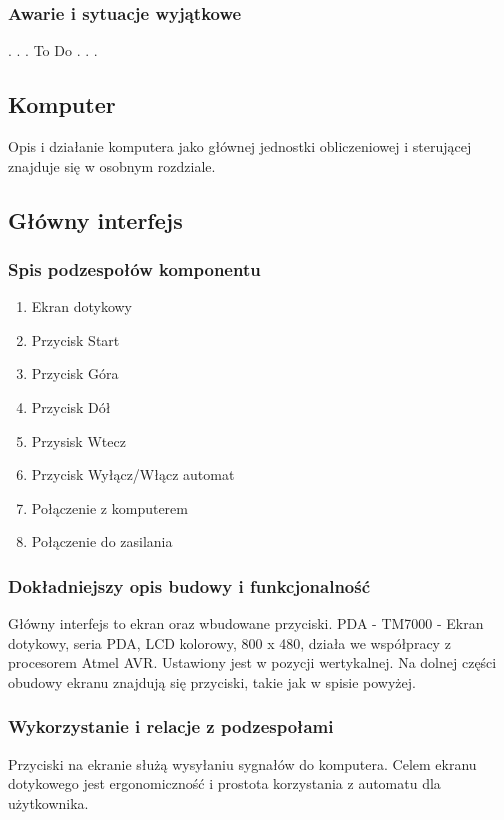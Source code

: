 \documentclass[12pt,a4paper,notitlepage]{report}
\begin{document}
\subsubsection{Awarie i sytuacje wyjątkowe}
. . . To Do . . .



\subsection{Komputer}
Opis i działanie komputera jako głównej jednostki obliczeniowej i sterującej znajduje się w osobnym rozdziale.

\subsection{Główny interfejs}
\subsubsection{Spis podzespołów komponentu}
\begin{enumerate}
  \item Ekran dotykowy
  \item Przycisk Start
  \item Przycisk Góra
  \item Przycisk Dół
  \item Przysisk Wtecz
  \item Przycisk Wyłącz/Włącz automat
  \item Połączenie z komputerem
  \item Połączenie do zasilania
\end{enumerate}

\subsubsection{Dokładniejszy opis budowy i funkcjonalność}
Główny interfejs to ekran oraz wbudowane przyciski. PDA - TM7000 -  Ekran dotykowy, seria PDA, LCD kolorowy, 800 x 480, działa we współpracy z procesorem Atmel AVR. Ustawiony jest w pozycji wertykalnej. Na dolnej części obudowy ekranu znajdują się przyciski, takie jak w spisie powyżej.
 
\subsubsection{Wykorzystanie i relacje z podzespołami}
Przyciski na ekranie służą wysyłaniu sygnałów do komputera. Celem ekranu dotykowego jest ergonomiczność i prostota korzystania z automatu dla użytkownika.
\end{document}

